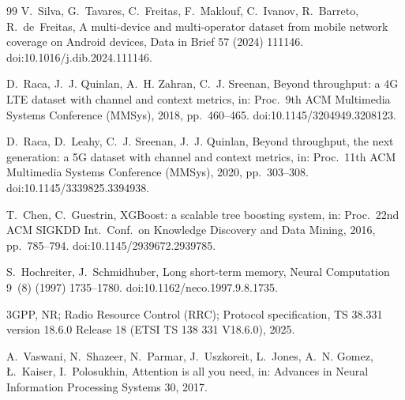 \documentclass[preprint,review,12pt]{elsarticle}
\begin{document}
\begin{thebibliography}{99}
V.~Silva, G.~Tavares, C.~Freitas, F.~Maklouf, C.~Ivanov, R.~Barreto, R.~de~Freitas,
A multi-device and multi-operator dataset from mobile network coverage on Android
devices, Data in Brief 57 (2024) 111146. doi:10.1016/j.dib.2024.111146.

D.~Raca, J.~J. Quinlan, A.~H. Zahran, C.~J. Sreenan, Beyond throughput: a 4G LTE
dataset with channel and context metrics, in: Proc.\ 9th ACM Multimedia Systems
Conference (MMSys), 2018, pp.~460--465. doi:10.1145/3204949.3208123.

D.~Raca, D.~Leahy, C.~J. Sreenan, J.~J. Quinlan, Beyond throughput, the next
generation: a 5G dataset with channel and context metrics, in: Proc.\ 11th ACM
Multimedia Systems Conference (MMSys), 2020, pp.~303--308.
doi:10.1145/3339825.3394938.

T.~Chen, C.~Guestrin, XGBoost: a scalable tree boosting system, in: Proc.\ 22nd ACM
SIGKDD Int.\ Conf.\ on Knowledge Discovery and Data Mining, 2016, pp.~785--794.
doi:10.1145/2939672.2939785.

S.~Hochreiter, J.~Schmidhuber, Long short-term memory, Neural Computation 9~(8)
(1997) 1735--1780. doi:10.1162/neco.1997.9.8.1735.

3GPP, NR; Radio Resource Control (RRC); Protocol specification, TS 38.331 version
18.6.0 Release 18 (ETSI TS 138 331 V18.6.0), 2025.

A.~Vaswani, N.~Shazeer, N.~Parmar, J.~Uszkoreit, L.~Jones, A.~N. Gomez,
{\L}.~Kaiser, I.~Polosukhin, Attention is all you need, in: Advances in Neural
Information Processing Systems 30, 2017.

\end{thebibliography}
\end{document}
